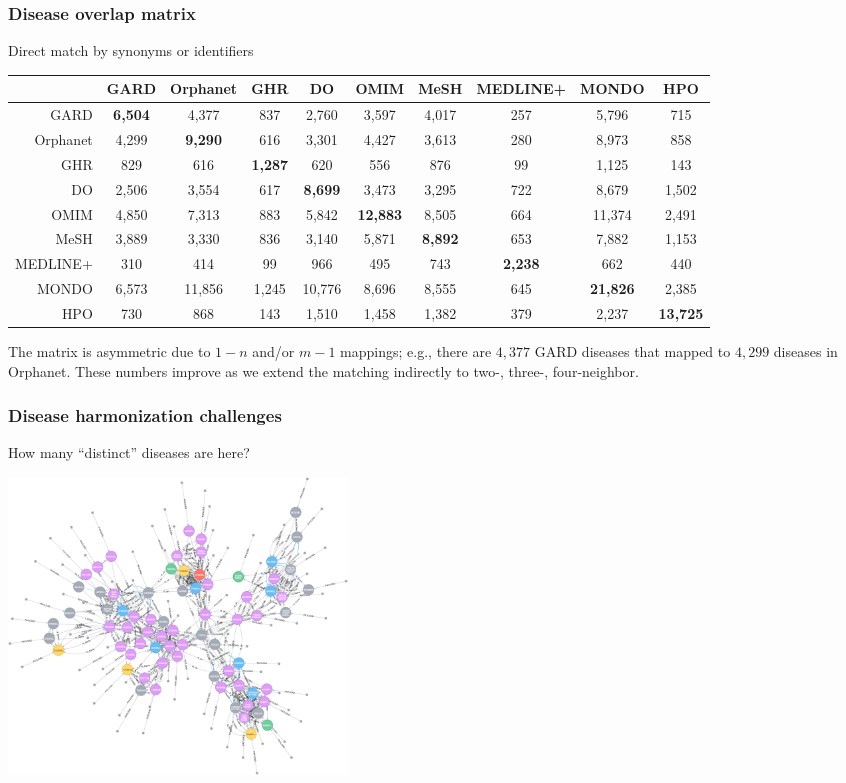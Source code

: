 ﻿\documentclass[anchorcolor=blue,linkcolor=blue]{beamer}
\begin{document}
\begin{frame}
  \frametitle{Disease overlap matrix}
  \begin{block}{Direct match by synonyms or identifiers}
    \begin{center}
      \tiny
      \begin{tabular}{rccccccccc}\toprule
        & GARD & Orphanet & GHR & DO & OMIM & MeSH & MEDLINE+&MONDO & HPO\\ \midrule
        GARD & \textbf{6,504}&4,377&837&2,760&3,597&4,017&257&5,796&715\\
        Orphanet &4,299&\textbf{9,290}&616&3,301&4,427&3,613&280&8,973&858\\
        GHR &829&616&\textbf{1,287}&620&556&876&99&1,125&143\\
        DO &2,506&3,554&617&\textbf{8,699}&3,473&3,295&722&8,679&1,502\\
        OMIM &4,850&7,313&883&5,842&\textbf{12,883}&8,505&664&11,374&2,491\\
        MeSH &3,889&3,330&836&3,140&5,871&\textbf{8,892}&653&7,882&1,153\\
        MEDLINE+ &310&414&99&966&495&743&\textbf{2,238}&662&440\\
        MONDO &6,573&11,856&1,245&10,776&8,696&8,555&645&\textbf{21,826}&2,385\\
        HPO &730&868&143&1,510&1,458&1,382&379&2,237&\textbf{13,725}\\ \bottomrule
      \end{tabular}
    \end{center}
    The matrix is asymmetric due to $1-n$ and/or $m-1$ mappings; e.g.,
    there are $4,377$ GARD diseases that mapped to $4,299$ diseases in
    Orphanet. These numbers improve as we extend the
    matching indirectly to two-, three-, four-neighbor. 
  \end{block}
\end{frame}

\begin{frame}
  \frametitle{Disease harmonization challenges}
  \begin{block}{How many ``distinct'' diseases are here?}
    \centerline{\includegraphics[width=9cm]{graph1}}
  \end{block}
\end{frame}
\end{document}
